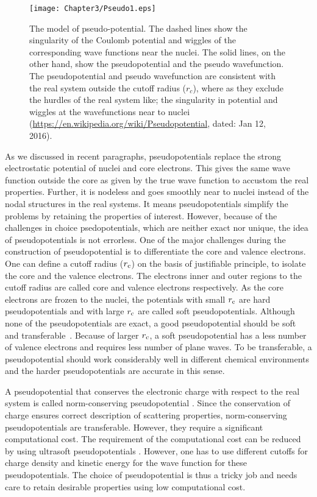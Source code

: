 \begin{figure}[h!]
\centering
\texttt{[image: Chapter3/Pseudo1.eps]}
\caption[The model of pseudo-potential.]{The model of pseudo-potential. The dashed lines show the singularity of the Coulomb potential and wiggles of the corresponding wave functions near the nuclei. The solid lines, on the other hand, show the pseudopotential and the pseudo wavefunction. The pseudopotential and pseudo wavefunction are consistent with the real system outside the cutoff radius ($r_c$), where as they exclude the hurdles of the real system like; the singularity in potential and wiggles at the wavefunctions near to nuclei (\url{https://en.wikipedia.org/wiki/Pseudopotential}, dated: Jan 12, 2016).}  
\end{figure}

As we discussed in recent paragraphs, pseudopotentials replace the strong electrostatic potential of nuclei and core electrons. This gives the same wave function outside the core as given by the true wave function to accustom the real properties. Further, it is nodeless and goes smoothly near to nuclei instead of the nodal structures in the real systems. It means pseudopotentials simplify the problems by retaining the properties of interest. However, because of the challenges in choice psedopotentials, which are neither exact nor unique, the 
idea of pseudopotentials is not errorless. One of the major challenges during the construction of pseudopotential is to differentiate the core and valence electrons. One can define a cutoff radius ($r_{\rm c}$) on the basis of justifiable principle, to isolate the core and the valence electrons. The electrons inner and outer regions to the cutoff radius are called core and valence electrons respectively. As the core electrons are frozen to the nuclei, the potentials with small $r_{\rm c}$ are hard pseudopotentials and with large $r_{\rm c}$ are called soft pseudopotentials. Although none of the pseudopotentials are exact, a good pseudopotential should be soft and transferable~\citep{Vanderbilt1990}. Because of larger $r_{\rm c}$, a soft pseudopotential has a less number of valence electrons and requires less number of plane waves. To be transferable, a pseudopotential should work 
considerably well in different chemical environments and the harder pseudopotentials are accurate in this sense.

A pseudopotential that conserves the electronic charge with respect to the real system is called norm-conserving pseudopotential \citep{Hamann1979}. Since the conservation of charge ensures correct description of scattering properties, norm-conserving pseudopotentials are transferable. However, they require a significant computational cost. The requirement of the computational cost can be reduced by using ultrasoft pseudopotentials \citep{Vanderbilt1990}. However, one has to use different cutoffs for charge density and  kinetic energy for the wave function for these pseudopotentials. The choice of pseudopotential is thus a tricky job and needs care to retain desirable properties using low computational cost. 

